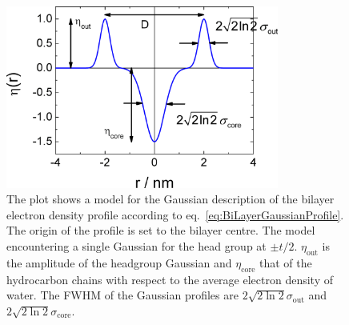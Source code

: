 \begin{figure}[htb]
\begin{center}
\includegraphics[width=0.8\textwidth,height=0.55\textwidth]{../images/form_factor/anisotropic/BiLayerGauss_Profile.png}
\end{center}
\caption{
The plot shows a model for the Gaussian description of the bilayer electron density profile according to
eq.\ \ref{eq:BiLayerGaussianProfile}.
The origin of the profile is set to the bilayer centre. The model encountering a single Gaussian for the head
group at $\pm t/2$. $\eta_\textrm{out}$ is the amplitude of the headgroup Gaussian and $\eta_\textrm{core}$ that of
the hydrocarbon chains with respect to the average electron density of water. The FWHM of the Gaussian profiles are
$2\sqrt{2\ln 2}\sigma_\textrm{out}$ and $2\sqrt{2\ln 2}\sigma_\textrm{core}$.}
\label{fig:bilayerprofile}
\end{figure}

